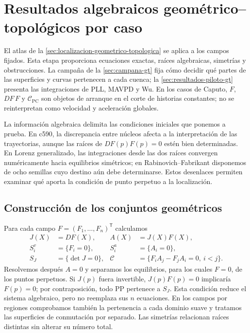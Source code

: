 \section{Resultados algebraicos geométrico--topológicos por caso}
\label{sec:resultados-gt-casos}

El atlas de la \cref{sec:localizacion-geometrico-topologica} se aplica a los
campos fijados. Esta etapa proporciona ecuaciones exactas, raíces algebraicas,
simetrías y obstrucciones. La campaña de la \cref{sec:campana-gt} fija cómo
decidir qué partes de las superficies y curvas pertenecen a cada cuenca; la
\cref{sec:resultados-piloto-gt} presenta las integraciones de PLL,
MAVPD y Wu. En los casos de Caputo, $F$, $DF\,F$ y
$\mathcal C_{\mathrm{PC}}$ son objetos de arranque en el corte de historias
constantes; no se reinterpretan como velocidad y aceleración globales.

La información algebraica delimita las condiciones iniciales que ponemos a
prueba. En c590, la discrepancia entre núcleos afecta a la interpretación de
las trayectorias, aunque las raíces de \(DF(p)F(p)=0\) estén bien determinadas.
En Lorenz generalizado, las integraciones desde las dos raíces convergen
numéricamente hacia equilibrios simétricos; en Rabinovich--Fabrikant disponemos
de ocho semillas cuyo destino aún debe determinarse. Estos desenlaces
permiten examinar qué aporta la condición de punto perpetuo a la localización.

\subsection{Construcción de los conjuntos geométricos}

Para cada campo $F=(F_1,\ldots,F_n)^{\mathsf T}$ calculamos
\begin{align}
 J(X)&=DF(X), & A(X)&=J(X)F(X),
 \label{casegt:eq:JA}\\
 S_i^v&=\{F_i=0\}, & S_i^a&=\{A_i=0\},
 \label{casegt:eq:surfaces}\\
 S_J&=\{\det J=0\}, &
 \mathcal C&=\{F_iA_j-F_jA_i=0,\ i<j\}.
 \label{casegt:eq:singular-connecting}
\end{align}
Resolvemos después $A=0$ y separamos los equilibrios, para los cuales
$F=0$, de los puntos perpetuos. Si $J(p)$ fuera invertible,
$J(p)F(p)=0$ implicaría $F(p)=0$; por contraposición, todo PP pertenece a
$S_J$. Esta condición reduce el sistema algebraico, pero no reemplaza sus
$n$ ecuaciones. En los campos por regiones comprobamos también la pertenencia
a cada dominio suave y tratamos las superficies de conmutación por separado.
Las simetrías relacionan raíces distintas sin alterar su número total.

